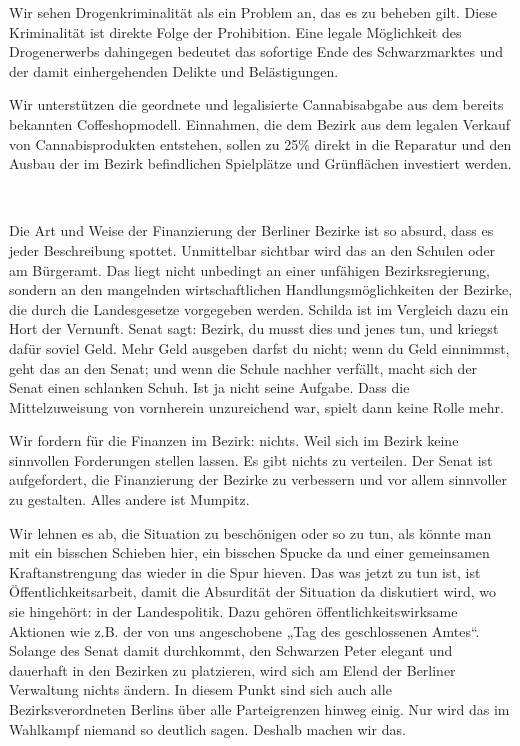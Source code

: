 \documentclass[a4paper,10pt]{article}
\newcommand{\mysection}[1]{{\vspace{1cm}\noindent\color{gray}{\ttfamily\LARGE\raggedright #1}\\\medskip}}
\newcommand{\abschnitt}[2]{%
\mysection{\raggedright #1}%
\begin{figure}[t]%
\vspace*{-2.7cm}%
\hspace*{-2.1cm}%
\texttt{[image: images/blog/large/\#2]} %
\end{figure}%
}
\begin{document}
Wir sehen Drogenkriminalität als ein Problem an, das es zu beheben gilt.
Diese Kriminalität ist direkte Folge der Prohibition. Eine legale
Möglichkeit des Drogenerwerbs dahingegen bedeutet das sofortige Ende des
Schwarzmarktes und der damit einhergehenden Delikte und Belästigungen.

Wir unterstützen die geordnete und legalisierte Cannabisabgabe aus dem
bereits bekannten Coffeshopmodell. Einnahmen, die dem Bezirk aus dem
legalen Verkauf von Cannabisprodukten entstehen, sollen zu 25\% direkt
in die Reparatur und den Ausbau der im Bezirk befindlichen Spielplätze
und Grünflächen investiert werden.

\mysection{Finanzen}

Die Art und Weise der Finanzierung der Berliner Bezirke ist so absurd,
dass es jeder Beschreibung spottet. Unmittelbar sichtbar wird das an den
Schulen oder am Bürgeramt. Das liegt nicht unbedingt an einer unfähigen
Bezirksregierung, sondern an den mangelnden wirtschaftlichen
Handlungsmöglichkeiten der Bezirke, die durch die Landesgesetze
vorgegeben werden. Schilda ist im Vergleich dazu ein Hort der Vernunft.
Senat sagt: Bezirk, du musst dies und jenes tun, und kriegst dafür
soviel Geld. Mehr Geld ausgeben darfst du nicht; wenn du Geld einnimmst,
geht das an den Senat; und wenn die Schule nachher verfällt, macht sich
der Senat einen schlanken Schuh. Ist ja nicht seine Aufgabe. Dass die
Mittelzuweisung von vornherein unzureichend war, spielt dann keine Rolle
mehr.

Wir fordern für die Finanzen im Bezirk: nichts. Weil sich im Bezirk
keine sinnvollen Forderungen stellen lassen. Es gibt nichts zu
verteilen. Der Senat ist aufgefordert, die Finanzierung der Bezirke zu
verbessern und vor allem sinnvoller zu gestalten. Alles andere ist
Mumpitz.

Wir lehnen es ab, die Situation zu beschönigen oder so zu tun, als
könnte man mit ein bisschen Schieben hier, ein bisschen Spucke da und
einer gemeinsamen Kraftanstrengung das wieder in die Spur hieven. Das
was jetzt zu tun ist, ist Öffentlichkeitsarbeit, damit die Absurdität
der Situation da diskutiert wird, wo sie hingehört: in der
Landespolitik. Dazu gehören öffentlichkeitswirksame Aktionen wie z.B.
der von uns angeschobene „Tag des geschlossenen Amtes``. Solange des
Senat damit durchkommt, den Schwarzen Peter elegant und dauerhaft in den
Bezirken zu platzieren, wird sich am Elend der Berliner Verwaltung
nichts ändern. In diesem Punkt sind sich auch alle Bezirksverordneten
Berlins über alle Parteigrenzen hinweg einig. Nur wird das im Wahlkampf
niemand so deutlich sagen. Deshalb machen wir das.
\end{document}
